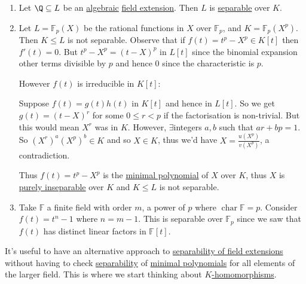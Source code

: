 \documentclass{article}
\DeclareMathOperator{\chara}{char}
\newcommand{\F}{\mathbb{F}}
\begin{document}
\begin{eg}
    \leavevmode
    \begin{enumerate}[label=(\arabic*)]
        \item Let $\Q \subseteq L$ be an \hyperlink{def:algebraic}{algebraic} \hyperlink{def:fieldExt}{field extension}. Then $L$ is \hyperlink{def:separablePoly}{separable} over $K$.
        \item Let $L = \F_p(X)$ be the rational functions in $X$ over $\F_p$, and $K = \F_p(X^p)$.
            Then $K \leq L$ is not separable. Observe that if $f(t) = t^p - X^p \in K[t]$ then $f'(t) = 0$. But $t^p - X^p = (t-X)^p$ in $L[t]$ since the binomial expansion other terms divisible by $p$ and hence $0$ since the characteristic is $p$.

            However $f(t)$ is irreducible in $K[t]$:

            Suppose $f(t) = g(t) h(t)$ in $K[t]$ and hence in $L[t]$. So we get $g(t) = (t-X)^r$ for some $0 \leq r < p$ if the factorisation is non-trivial.
            But this would mean $X^r$ was in $K$. However, $\exists$integers $a, b$ such that $ar + bp = 1$.
            So $(X^r)^a (X^p)^b \in K$ and so $X \in K$, thus we'd have $X = \frac{u(X^p)}{v(X^p)}$, a contradiction.

            Thus $f(t) = t^p - X^p$ is the \hyperlink{def:minimalPoly}{minimal polynomial} of $X$ over $K$, thus $X$ is \hyperlink{def:separableExt}{purely inseparable} over $K$ and $K \leq L$ is not separable.
        \item Take $\F$ a finite field with order $m$, a power of $p$ where $\chara \F = p$. Consider $f(t) = t^n - 1$ where $n = m-1$. This is separable over $\F_p$ since we saw that $f(t)$ has distinct linear factors in $\F[t]$.
    \end{enumerate}
\end{eg}

\begin{remark}
    It's useful to have an alternative approach to \hyperlink{def:separableExt}{separability of field extensions} without having to check \hyperlink{def:separablePoly}{separability}
    of \hyperlink{def:minimalPoly}{minimal polynomials} for all elements of the larger field.
    This is where we start thinking about \hyperlink{def:homo}{$K$-homomorphisms}.
\end{remark}
\end{document}
